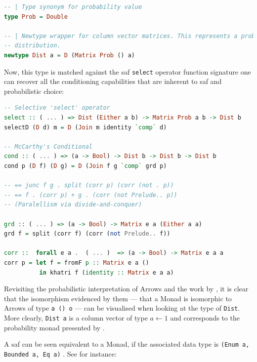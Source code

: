 \documentclass[
  oneside,
  11pt, a4paper,
  footinclude=true,
  headinclude=true,
  cleardoublepage=empty
]{scrbook}
\theoremstyle{definition}
\theoremstyle{definition}
\begin{document}
        \begin{lstlisting}[language=Haskell, caption={Dist type alias},captionpos=b]
-- | Type synonym for probability value
type Prob = Double

-- | Newtype wrapper for column vector matrices. This represents a probability
-- distribution.
newtype Dist a = D (Matrix Prob () a)
        \end{lstlisting}
        
        Now, this type is matched against the \gls{saf} \texttt{select} operator function signature one can recover all the conditioning capabilities that are inherent to \gls{saf} and probabilistic choice:
        
        \begin{lstlisting}[language=Haskell, caption={Dist - \texttt{select} and \texttt{cond} operators},captionpos=b]
-- Selective 'select' operator
select :: ( ... ) => Dist (Either a b) -> Matrix Prob a b -> Dist b 
selectD (D d) m = D (Join m identity `comp` d)

-- McCarthy's Conditional
cond :: ( ... ) => (a -> Bool) -> Dist b -> Dist b -> Dist b
cond p (D f) (D g) = D (Join f g `comp` grd p)

-- == junc f g . split (corr p) (corr (not . p))
-- == f . (corr p) + g . (corr (not Prelude.. p))
-- (Paralellism via divide-and-conquer)

grd :: ( ... ) => (a -> Bool) -> Matrix e a (Either a a)
grd f = split (corr f) (corr (not Prelude.. f))

corr ::  forall e a .  ( ... )  => (a -> Bool) -> Matrix e a a
corr p = let f = fromF p :: Matrix e a ()
          in khatri f (identity :: Matrix e a a)
        \end{lstlisting}{}
        
        Revisiting the probabilistic interpretation of Arrows and the work by \cite{Lindley:2011:IOA:1953652.1954016}, it is clear that the isomorphism evidenced by them --- that a Monad is isomorphic to Arrows of type \texttt{a () o} --- can be visualised when looking at the type of \texttt{Dist}. More clearly, \texttt{Dist a} is a column vector of type $a \leftarrow 1$ and corresponds to the probability monad presented by \cite{erwig_kollmansberger_2006}.
        
        A \gls{saf} can be seen equivalent to a Monad, if the associated data type is \texttt{(Enum a, Bounded a, Eq a)} \citep{andrey2019selective}. See for instance:
        
\end{document}
